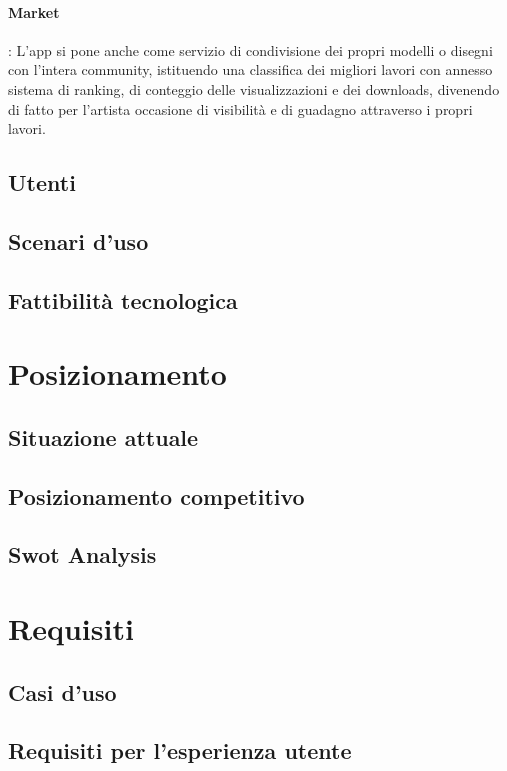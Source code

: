 \documentclass[a4paper, twoside]{article}
\begin{document}
\paragraph{Market}: L'app si  pone anche come servizio di condivisione dei propri modelli o disegni con l'intera community, istituendo una classifica dei migliori lavori con annesso sistema di ranking, di conteggio delle visualizzazioni e dei downloads, divenendo di fatto per l'artista occasione di visibilità e di guadagno attraverso i propri lavori.\\

\subsection{Utenti}
\subsection{Scenari d'uso}
\subsection{Fattibilità tecnologica}

\section{Posizionamento}
\subsection{Situazione attuale}
\subsection{Posizionamento competitivo}
\subsection{Swot Analysis}

\section{Requisiti}
\subsection{Casi d'uso}
\subsection{Requisiti per l'esperienza utente}
\end{document}

